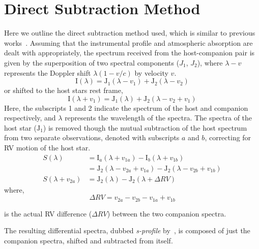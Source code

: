 \section{Direct Subtraction Method}
\label{sec:direct-subtraction}
Here we outline the direct subtraction method used, which is similar to previous works~\citep{ferluga_separating_1997,kostogryz_spectral_2013}. Assuming that the instrumental profile and atmospheric absorption are dealt with appropriately, the spectrum received from the host-companion pair is given by the superposition of two spectral components (\(J_{1}\), \(J_{2}\)), where \(\lambda-v\) represents the Doppler shift \(\lambda(1-v/c)\) by velocity \(v\).
\begin{equation}
\textrm{I}(\lambda) = \textrm{J}_{1}(\lambda - v_{1}) + \textrm{J}_{2}(\lambda - v_{2})
\end{equation}
or shifted to the host stars rest frame,
\begin{equation}
\textrm{I}(\lambda + v_{1}) = \textrm{J}_{1}(\lambda) + \textrm{J}_{2}(\lambda - v_{2} + v_{1})
\end{equation}
Here, the subscripts 1 and 2 indicate the spectrum of the host and companion respectively, and \(\lambda\) represents the wavelength of the spectra.
The spectra of the host star (\(\textrm{J}_{1}\)) is removed though the mutual subtraction of the host spectrum from two separate observations, denoted with subscripts \(a\) and \(b\), correcting for {RV} motion of the host star.
\begin{align}
S(\lambda) &= \textrm{I}_{a}(\lambda + v_{1a}) - \textrm{I}_{b}(\lambda + v_{1b}) \nonumber \\
&= \textrm{J}_{2}(\lambda - v_{2a} + v_{1a}) - \textrm{J}_{2}(\lambda - v_{2b}  + v_{1b}) \nonumber \\
S(\lambda + v_{2a}) &= \textrm{J}_{2}(\lambda) - \textrm{J}_{2}(\lambda + \Delta {RV}) \label{eqn:sprofile}
\end{align}
where,
\begin{equation}
\Delta {RV} = v_{2a} - v_{2b} - v_{1a} + v_{1b} \label{eqn:k}
\end{equation}

is the actual {RV} difference (\(\Delta {RV}\)) between the two companion spectra.

The resulting differential spectra, dubbed \emph{s-profile} by~\citet{ferluga_separating_1997}, is composed of just the companion spectra, shifted and subtracted from itself.

